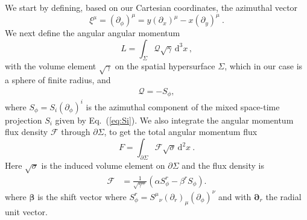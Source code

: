 \documentclass[aps,twocolumn,nofootinbib,superscriptaddress,amsfonts,floatfix
]{revtex4-1} %
\newcommand{\dd}{\mathrm{d}}
\newcommand{\bs}{\boldsymbol}
\begin{document}
We start by defining, based on our Cartesian coordinates, the azimuthal vector
\begin{equation}
    {\xi}^\mu = (\partial_{\phi})^\mu = y(\partial_x)^\mu - x (\partial_y)^\mu~.
\end{equation}
We next define the angular angular momentum
\begin{equation}
    \mathbin{{L = \int_{\Sigma} \mathcal{Q} \sqrt{\gamma}\,
    \dd^3x}}\,,
\end{equation}
with the volume element $\sqrt{\gamma}$ on the spatial hypersurface $\Sigma$, which in our case is a sphere of finite radius, and 
\begin{align}   
    \mathcal{Q} = -S_\phi, 
\end{align}
where $S_\phi = S_i (\partial_\phi)^i$ is the azimuthal component of
the mixed space-time projection $S_i$ given by Eq.~(\ref{eq:Si}). 
We also integrate the angular momentum flux density $\mathcal{F}$ through
$\partial \Sigma$, to get the total angular momentum flux
\begin{equation}
    \mathbin{{F = \int_{\partial \Sigma} \mathcal{F} \sqrt{\sigma }\,
    \dd^2x}}~.\label{eqn:DefAngMomFlux}
\end{equation}
Here $\sqrt{\sigma}$ is the induced volume element on $\partial \Sigma$ and the flux density is
\begin{align}
    \mathcal{F} &= \frac{1}{\sqrt{\gamma^{rr}}}\left(\alpha S^r_\phi -\beta^r S_\phi\right).
\end{align}
where $\bs\beta$ is the shift vector where $S^r_\phi = {S^{\mu}}_{\nu} (\partial_r)_{\mu} (\partial_\phi)^{\nu} $ and with $\bs{\partial}_{r}$ the radial unit vector.
\end{document}
